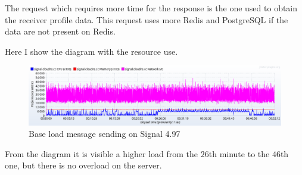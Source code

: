 \begin{table}[H]
\caption{Base load message sending on Signal 4.97}
\label{tab:baseloadmessageold}
\end{table}

The request which requires more time for the response is the one used to obtain the receiver profile data.
This request uses more Redis and PostgreSQL if the data are not present on Redis.

Here I show the diagram with the resource use.

\begin{figure}[H]
    \centering
    \includegraphics[width=\textwidth]{images/497/signal-base-message-load}
    \caption{Base load message sending on Signal 4.97}
    \label{fig:signalbasemessageloadold}
\end{figure}

From the diagram it is visible a higher load from the $26$th minute to the $46$th one, but there is no overload on the server.

